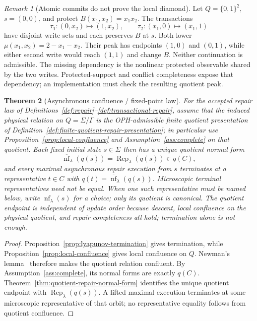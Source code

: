 \documentclass[11pt]{article}
\newtheorem{theorem}{Theorem}[section]
\theoremstyle{remark}
\newtheorem{remark}[theorem]{Remark}
\theoremstyle{plain}
\begin{document}
\begin{remark}[Atomic commits do not prove the local diamond]
Let \(Q=\{0,1\}^2\), \(s=(0,0)\), and protect
\(B(x_1,x_2)=x_1x_2\). The transactions
\[
\tau_1:(0,x_2)\mapsto(1,x_2),
\qquad
\tau_2:(x_1,0)\mapsto(x_1,1)
\]
have disjoint write sets and each preserves \(B\) at \(s\). Both lower
\(\mu(x_1,x_2)=2-x_1-x_2\). Their peak has endpoints \((1,0)\) and \((0,1)\), while either second
write would reach \((1,1)\) and change \(B\). Neither continuation is admissible. The missing
dependency is the nonlinear protected observable shared by the two writes. Protected-support and
conflict completeness expose that dependency; an implementation must check the resulting
quotient peak.
\end{remark}

\begin{theorem}[Asynchronous confluence / fixed-point law]\label{thm:confluence}
For the accepted repair law of Definitions~\ref{def:repair}--\ref{def:transactional-repair},
assume that the induced physical relation on \(Q=\Sigma/\Gamma\) is the
OPH-admissible finite quotient presentation of
Definition~\ref{def:finite-quotient-repair-presentation}; in particular use
Proposition~\ref{prop:local-confluence} and Assumption~\ref{ass:complete} on
that quotient. Each fixed initial state \(s\in\Sigma\) then has a unique
\emph{quotient} normal form
\[
\overline{\operatorname{nf}}_\lambda(q(s))
=\operatorname{Rep}_\lambda(q(s))\in q(C),
\]
and every maximal asynchronous repair execution from \(s\) terminates at a
representative \(t\in C\) with
\(q(t)=\overline{\operatorname{nf}}_\lambda(q(s))\). Microscopic terminal
representatives need not be equal. When one such representative must be
named below, write \(\operatorname{nf}_\lambda(s)\) for a choice; only its
quotient is canonical. The quotient endpoint is independent of update order
because descent, local confluence on the physical quotient, and repair
completeness all hold; termination alone is not enough.
\end{theorem}

\begin{proof}
Proposition~\ref{prop:lyapunov-termination} gives termination, while
Proposition~\ref{prop:local-confluence} gives local confluence on \(Q\).
Newman's lemma~\cite{newman42} therefore makes the quotient relation
confluent. By Assumption~\ref{ass:complete}, its normal forms are exactly
\(q(C)\). Theorem~\ref{thm:quotient-repair-normal-form} identifies the unique
quotient endpoint with \(\operatorname{Rep}_\lambda(q(s))\). A lifted maximal
execution terminates at some microscopic representative of that orbit; no
representative equality follows from quotient confluence.
\end{proof}
\end{document}
